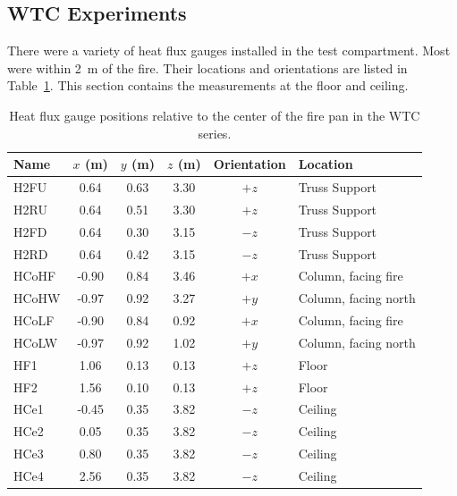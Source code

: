 \clearpage


\subsection{WTC Experiments}

There were a variety of heat flux gauges installed in the test compartment. Most were within 2~m of the fire. Their locations and orientations are listed in Table~\ref{WTC_Gauges}. This section contains the measurements at the floor and ceiling.

\begin{table}[h!]
\caption{Heat flux gauge positions relative to the center of the fire pan in the WTC series.}
\begin{center}
\begin{tabular}{|l|c|c|c|c|l|}
\hline
Name    & $x$ (m)   & $y$ (m) & $z$ (m)   & Orientation  & Location  \\ \hline \hline
H2FU    & 0.64      & 0.63    & 3.30      &     $+z$     & Truss Support         \\ \hline
H2RU    & 0.64      & 0.51    & 3.30      &     $+z$     & Truss Support          \\ \hline
H2FD    & 0.64      & 0.30    & 3.15      &     $-z$     & Truss Support          \\ \hline
H2RD    & 0.64      & 0.42    & 3.15      &     $-z$     & Truss Support          \\ \hline
HCoHF   & -0.90     & 0.84    & 3.46      &     $+x$     & Column, facing fire          \\ \hline
HCoHW   & -0.97     & 0.92    & 3.27      &     $+y$     & Column, facing north          \\ \hline
HCoLF   & -0.90     & 0.84    & 0.92      &     $+x$     & Column, facing fire          \\ \hline
HCoLW   & -0.97     & 0.92    & 1.02      &     $+y$     & Column, facing north          \\ \hline
HF1     & 1.06      & 0.13    & 0.13      &     $+z$     & Floor          \\ \hline
HF2     & 1.56      & 0.10    & 0.13      &     $+z$     & Floor          \\ \hline
HCe1    & -0.45     & 0.35    & 3.82      &     $-z$     & Ceiling          \\ \hline
HCe2    &  0.05     & 0.35    & 3.82      &     $-z$     & Ceiling          \\ \hline
HCe3    &  0.80     & 0.35    & 3.82      &     $-z$     & Ceiling          \\ \hline
HCe4    &  2.56     & 0.35    & 3.82      &     $-z$     & Ceiling          \\ \hline
\end{tabular}
\end{center}
\label{WTC_Gauges}
\end{table}

